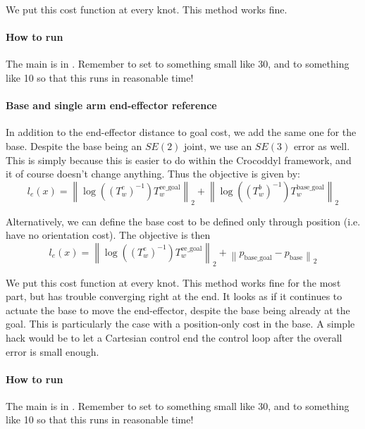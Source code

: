 We put this cost function at every knot.  This method works fine.
\paragraph{How to run} 
The main is in
.
Remember to set  to something small like 30,
and  to something like 10 
so that this runs in reasonable time!

\paragraph{Base and single arm end-effector reference} 
In addition to the end-effector distance to goal cost, 
we add the same one for the base. Despite the base
being an $ SE (2)  $ joint, we use an $ SE (3)  $ error as well.
This is simply because this is easier to do within the Crocoddyl framework,
and it of course doesn't change anything.
Thus the objective is given by:
\begin{equation}
l_{ e } (x)= \left\lVert 
\log \left( \left( T_{ w }^{ e } \right)^{ -1 } \right) T_{ w }^{ \text{ee\_goal} }
\right \rVert _{ 2 }
+ \left\lVert \log \left( \left( T_{ w }^{ b } \right)^{ -1 } \right) T_{ w }^{ \text{base\_goal} }
\right \rVert _{ 2 }
\end{equation}

Alternatively, we can define the base cost to be defined
only through position (i.e. have no orientation cost).
The objective is then
\begin{equation}
l_{ e } (x)= \left\lVert 
\log \left( \left( T_{ w }^{ e } \right)^{ -1 } \right) T_{ w }^{ \text{ee\_goal} }
\right \rVert _{ 2 }
+ \left\lVert  p_{ \text{base\_goal} }  - p_{ \text{base} }
\right \rVert _{ 2 }
\end{equation}

We put this cost function at every knot.  This method works fine for the most part,
but has trouble converging right at the end. It looks as if it continues to
actuate the base to move the end-effector, despite the base being already at the goal.
This is particularly the case with a position-only cost in the base.
A simple hack would be to let a Cartesian control end the control loop after
the overall error is small enough.
\paragraph{How to run} 
The main is in
.
Remember to set  to something small like 30,
and  to something like 10 
so that this runs in reasonable time!


